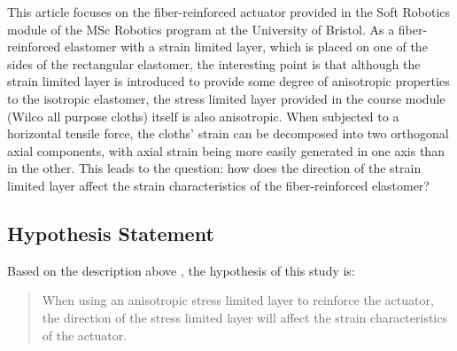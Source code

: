 \documentclass[conference]{IEEEtran}
\begin{document}
This article focuses on the fiber-reinforced actuator provided in the Soft Robotics module of the MSc Robotics program at the University of Bristol. As a fiber-reinforced elastomer with a strain limited layer\cite{stress_constraint_layer}, which is placed on one of the sides of the rectangular elastomer, the interesting point is that although the strain limited layer is introduced to provide some degree of anisotropic properties to the isotropic elastomer, the stress limited layer provided in the course module  (Wilco all purpose cloths) itself is also anisotropic. When subjected to a horizontal tensile force, the cloths' strain can be decomposed into two orthogonal axial components, with axial strain being more easily generated in one axis than in the other. This leads to the question: how does the direction of the strain limited layer affect the strain characteristics of the fiber-reinforced elastomer?


\subsection{Hypothesis Statement}


Based on the description above , the hypothesis of this study is:
\begin{quote}
When using an anisotropic stress limited layer to reinforce the actuator, the direction of the stress limited layer will affect the strain characteristics of the actuator.
\end{quote}

\end{document}
